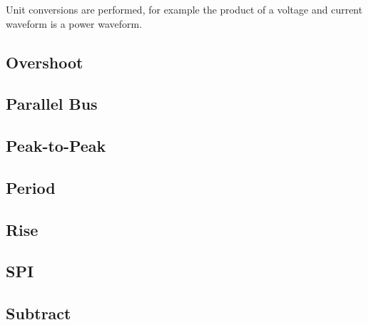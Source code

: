 Unit conversions are performed, for example the product of a voltage and current waveform is a power waveform.

\pagebreak
\subsection{Overshoot}

\pagebreak
\subsection{Parallel Bus}

\pagebreak
\subsection{Peak-to-Peak}

\pagebreak
\subsection{Period}

\pagebreak
\subsection{Rise}

\pagebreak
\subsection{SPI}

\pagebreak
\subsection{Subtract}

